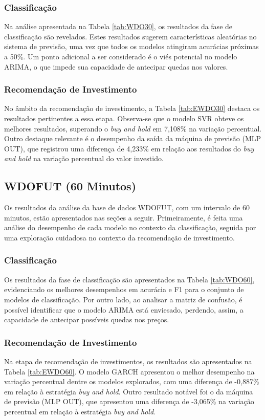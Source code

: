 \subsubsection{Classificação}
Na análise apresentada na Tabela \ref{tab:WDO30}, os resultados da fase de classificação são revelados. Estes resultados sugerem características aleatórias no sistema de previsão, uma vez que todos os modelos atingiram acurácias próximas a 50\%. Um ponto adicional a ser considerado é o viés potencial no modelo \ac{ARIMA}, o que impede sua capacidade de antecipar quedas nos valores.
\subsubsection{Recomendação de Investimento}
No âmbito da recomendação de investimento, a Tabela \ref{tab:EWDO30} destaca os resultados pertinentes a essa etapa. Observa-se que o modelo \ac{SVR} obteve os melhores resultados, superando o \textit{buy and hold} em 7,108\% na variação percentual. Outro destaque relevante é o desempenho da saída da máquina de previsão (\ac{MLP} OUT), que registrou uma diferença de 4,233\% em relação aos resultados do \textit{buy and hold} na variação percentual do valor investido.

\subsection{WDOFUT (60 Minutos)}
Os resultados da análise da base de dados WDOFUT, com um intervalo de 60 minutos, estão apresentados nas seções a seguir. Primeiramente, é feita uma análise do desempenho de cada modelo no contexto da classificação, seguida por uma exploração cuidadosa no contexto da recomendação de investimento.
\subsubsection{Classificação}
Os resultados da fase de classificação são apresentados na Tabela \ref{tab:WDO60}, evidenciando os melhores desempenhos em acurácia e \ac{F1} para o conjunto de modelos de classificação. Por outro lado, ao analisar a matriz de confusão, é possível identificar que o modelo \ac{ARIMA} está enviesado, perdendo, assim, a capacidade de antecipar possíveis quedas nos preços.
\subsubsection{Recomendação de Investimento}
Na etapa de recomendação de investimentos, os resultados são apresentados na Tabela \ref{tab:EWDO60}. O modelo \ac{GARCH} apresentou o melhor desempenho na variação percentual dentre os modelos explorados, com uma diferença de -0,887\% em relação à estratégia \textit{buy and hold}. Outro resultado notável foi o da máquina de previsão (\ac{MLP} OUT), que apresentou uma diferença de -3,065\% na variação percentual em relação à estratégia \textit{buy and hold}.


